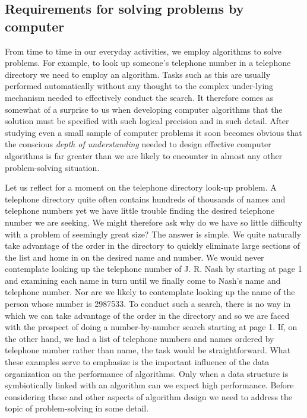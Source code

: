 \documentclass{book}
\begin{document}
\subsection{Requirements for solving problems by computer}
	From time to time in our everyday activities, we employ algorithms to solve problems. For example, to look up someone's telephone number in a telephone directory we need to employ an algorithm. Tasks such as this are usually performed automatically without any thought to the complex under-lying mechanism needed to effectively conduct the search. It therefore comes as somewhat of a surprise to us when developing computer algorithms that the solution must be specified with such logical precision and in such detail. After studying even a small sample of computer problems it soon becomes obvious that the conscious \textit{depth of understanding} needed to design effective computer algorithms is far greater than we are likely to encounter in almost any other problem-solving situation.\par
	Let us reflect for a moment on the telephone directory look-up problem. A telephone directory quite often contains hundreds of thousands of names and telephone numbers yet we have little trouble finding the desired telephone number we are seeking. We might therefore ask why do we have so little difficulty with a problem of seemingly great size? The answer is simple. We quite naturally take advantage of the order in the directory to quickly eliminate large sections of the list and home in on the desired name and number. We would never contemplate looking up the telephone number of J. R. Nash by starting at page 1 and examining each name in turn until we finally come to Nash's name and telephone number. Nor are we likely to contemplate looking up the name of the person whose number is 2987533. To conduct such a search, there is no way in which we can take advantage of the order in the directory and so we are faced with the prospect of doing a number-by-number search starting at page 1. If, on the other hand, we had a list of telephone numbers and names ordered by telephone number rather than name, the task would be straightforward. What these examples serve to emphasize is the important influence of the data organization on the performance of algorithms. Only when a data structure is symbiotically linked with an algorithm can we expect high performance. Before considering these and other aspects of algorithm design we need to address the topic of problem-solving in some detail. 
\end{document}
